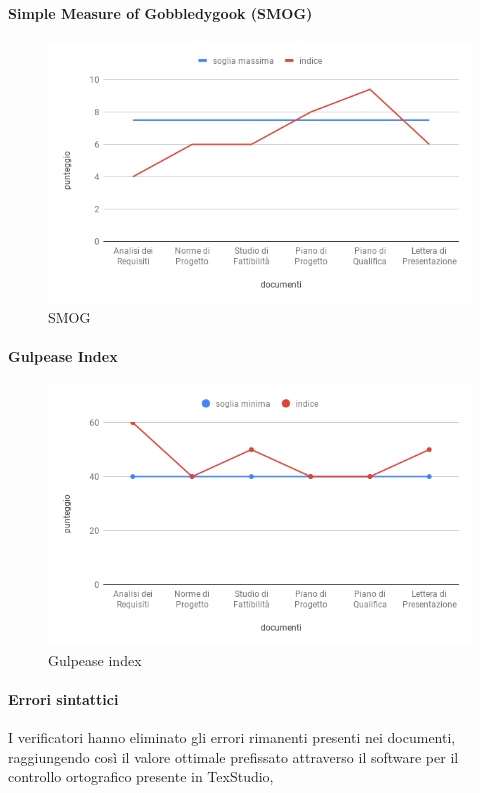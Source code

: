\paragraph{Simple Measure of Gobbledygook (SMOG)}
\hspace{15cm}
\begin{figure}[h!]
	\centering
	\includegraphics[scale=0.5]{Smog.png}
	\caption{SMOG}
\end{figure}
\clearpage
\paragraph{Gulpease Index}
\hspace{15cm}
\begin{figure}[h!]
	\centering
	\includegraphics[scale=0.5]{GulpeaseIndex.png}
	\caption{Gulpease index}
\end{figure}

\paragraph{Errori sintattici}
\hspace{15cm}
 I verificatori hanno eliminato gli errori rimanenti presenti nei documenti, raggiungendo così il valore ottimale prefissato attraverso il software per il controllo ortografico presente in TexStudio, 
